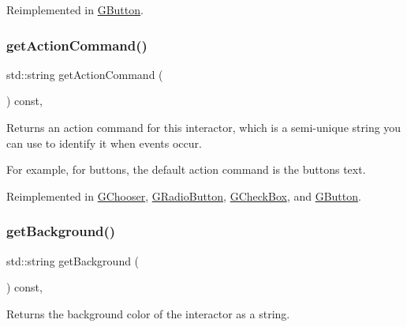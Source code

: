Reimplemented in \mbox{\hyperlink{classGButton_a432ca43c59ffb2adc9cb66d43621bc27}{G\+Button}}.

\mbox{\label{classGInteractor_a94eb4276000c4fdfb508ce9e6317a82a}} 
\subsubsection{\texorpdfstring{get\+Action\+Command()}{getActionCommand()}}
{\footnotesize\ttfamily std\+::string get\+Action\+Command (\begin{DoxyParamCaption}{ }\end{DoxyParamCaption}) const\hspace{0.3cm}{\ttfamily [virtual]}, {\ttfamily [inherited]}}



Returns an action command for this interactor, which is a semi-\/unique string you can use to identify it when events occur. 

For example, for buttons, the default action command is the button\textquotesingle{}s text. 

Reimplemented in \mbox{\hyperlink{classGChooser_a90f2b1e6f6e7dabd9d6e5307f7c6d1b7}{G\+Chooser}}, \mbox{\hyperlink{classGRadioButton_a90f2b1e6f6e7dabd9d6e5307f7c6d1b7}{G\+Radio\+Button}}, \mbox{\hyperlink{classGCheckBox_a90f2b1e6f6e7dabd9d6e5307f7c6d1b7}{G\+Check\+Box}}, and \mbox{\hyperlink{classGButton_a90f2b1e6f6e7dabd9d6e5307f7c6d1b7}{G\+Button}}.

\mbox{\label{classGInteractor_a808e22cc1fdfbecf71ed8c64ef4600e0}} 
\subsubsection{\texorpdfstring{get\+Background()}{getBackground()}}
{\footnotesize\ttfamily std\+::string get\+Background (\begin{DoxyParamCaption}{ }\end{DoxyParamCaption}) const\hspace{0.3cm}{\ttfamily [virtual]}, {\ttfamily [inherited]}}



Returns the background color of the interactor as a string. 


